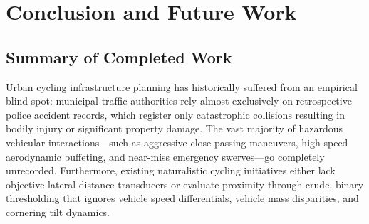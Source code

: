 \chapter{Conclusion and Future Work}
\label{chap:conclusion}

\section{Summary of Completed Work}
Urban cycling infrastructure planning has historically suffered from an empirical blind spot: municipal traffic authorities rely almost exclusively on retrospective police accident records, which register only catastrophic collisions resulting in bodily injury or significant property damage. The vast majority of hazardous vehicular interactions---such as aggressive close-passing maneuvers, high-speed aerodynamic buffeting, and near-miss emergency swerves---go completely unrecorded. Furthermore, existing naturalistic cycling initiatives either lack objective lateral distance transducers or evaluate proximity through crude, binary thresholding that ignores vehicle speed differentials, vehicle mass disparities, and cornering tilt dynamics.

